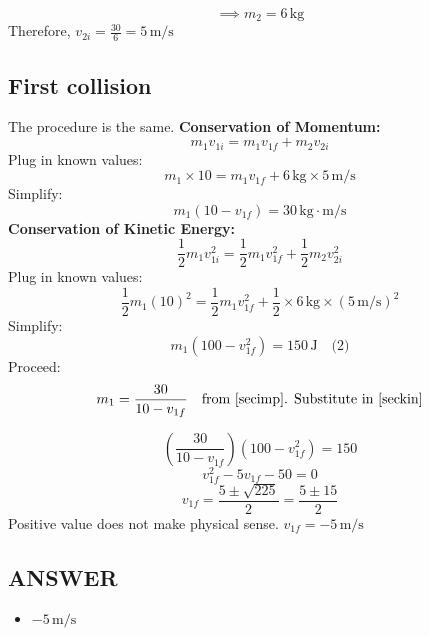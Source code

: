 \[
\implies m_2 = 6\,\text{kg}
\]
Therefore, \( v_{2i} = \frac{30}{6} = 5\,\text{m/s} \)

\subsection*{First collision}
The procedure is the same. \textbf{Conservation of Momentum:}
    \[
    m_1 v_{1i} = m_1 v_{1f} + m_2 v_{2i}
    \]
    Plug in known values:
    \[
    m_1 \times 10 = m_1 v_{1f} + 6\,\text{kg} \times 5\,\text{m/s}
    \]
    Simplify:
    \begin{equation}
        m_1 (10 - v_{1f}) = 30\,\text{kg}\cdot\text{m/s}
        \label{secimp}
    \end{equation}
\textbf{Conservation of Kinetic Energy:}
    \[
    \frac{1}{2} m_1 v_{1i}^2 = \frac{1}{2} m_1 v_{1f}^2 + \frac{1}{2} m_2 v_{2i}^2
    \]
    Plug in known values:
    \[
    \frac{1}{2} m_1 (10)^2 = \frac{1}{2} m_1 v_{1f}^2 + \frac{1}{2} \times 6\,\text{kg} \times (5\,\text{m/s})^2
    \]
    Simplify:
    \begin{equation}
        m_1 (100 - v_{1f}^2) = 150\,\text{J} \quad \text{(2)}
        \label{seckin}
    \end{equation}
Proceed:
    \[
    m_1 = \frac{30}{10 - v_{1f}} \quad \text{from \ref{secimp}. Substitute in \ref{seckin}}
    \]
    
    \[
    \left( \frac{30}{10 - v_{1f}} \right) (100 - v_{1f}^2) = 150
    \]
    \[
    v_{1f}^2 - 5 v_{1f} - 50 = 0
    \]
    \[
    v_{1f} = \frac{5 \pm \sqrt{225}}{2} = \boxed{\frac{5 \pm 15}{2}}
    \]
Positive value does not make physical sense. \( v_{1f} = -5\,\text{m/s} \)

\vfill \subsection*{ANSWER}
\begin{itemize}
    \item $-5\,\text{m/s}$
\end{itemize}



